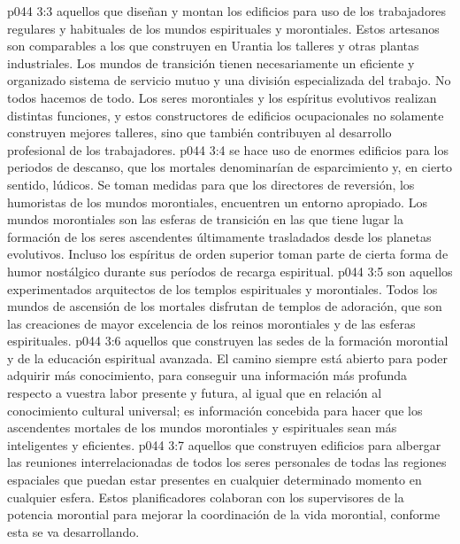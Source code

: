 \vs p044 3:3  aquellos que diseñan y montan los edificios para uso de los trabajadores regulares y habituales de los mundos espirituales y morontiales. Estos artesanos son comparables a los que construyen en Urantia los talleres y otras plantas industriales. Los mundos de transición tienen necesariamente un eficiente y organizado sistema de servicio mutuo y una división especializada del trabajo. No todos hacemos de todo. Los seres morontiales y los espíritus evolutivos realizan distintas funciones, y estos constructores de edificios ocupacionales no solamente construyen mejores talleres, sino que también contribuyen al desarrollo profesional de los trabajadores.
\vs p044 3:4  se hace uso de enormes edificios para los periodos de descanso, que los mortales denominarían de esparcimiento y, en cierto sentido, lúdicos. Se toman medidas para que los directores de reversión, los humoristas de los mundos morontiales, encuentren un entorno apropiado. Los mundos morontiales son las esferas de transición en las que tiene lugar la formación de los seres ascendentes últimamente trasladados desde los planetas evolutivos. Incluso los espíritus de orden superior toman parte de cierta forma de humor nostálgico durante sus períodos de recarga espiritual.
\vs p044 3:5  son aquellos experimentados arquitectos de los templos espirituales y morontiales. Todos los mundos de ascensión de los mortales disfrutan de templos de adoración, que son las creaciones de mayor excelencia de los reinos morontiales y de las esferas espirituales.
\vs p044 3:6  aquellos que construyen las sedes de la formación morontial y de la educación espiritual avanzada. El camino siempre está abierto para poder adquirir más conocimiento, para conseguir una información más profunda respecto a vuestra labor presente y futura, al igual que en relación al conocimiento cultural universal; es información concebida para hacer que los ascendentes mortales de los mundos morontiales y espirituales sean más inteligentes y eficientes.
\vs p044 3:7  aquellos que construyen edificios para albergar las reuniones interrelacionadas de todos los seres personales de todas las regiones espaciales que puedan estar presentes en cualquier determinado momento en cualquier esfera. Estos planificadores colaboran con los supervisores de la potencia morontial para mejorar la coordinación de la vida morontial, conforme esta se va desarrollando.
